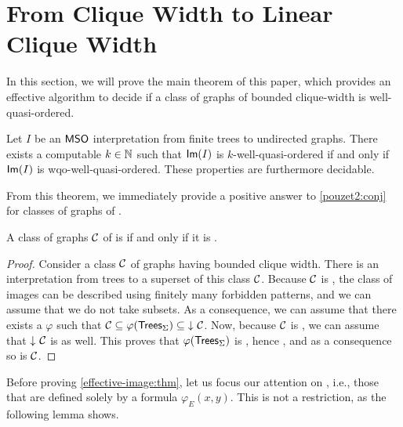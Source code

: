 \section{From Clique Width to Linear Clique Width}
\label{sec:bad-patterns}




In this section, we will prove the main theorem of this paper, which provides
an effective algorithm to decide if a class of graphs of bounded clique-width
is well-quasi-ordered. 

\begin{theorem}[restate=effective-image:thm,label={effective-image:thm}]
    \label{effective-image:thm}
    Let $I$ be an $\mathsf{MSO}$ interpretation
    from finite trees to undirected graphs.
    There exists a computable $k \in \mathbb{N}$
    such that $\mathsf{Im}(I)$
    is $k$-well-quasi-ordered
    if and only if 
    $\mathsf{Im}(I)$ is wqo-well-quasi-ordered.
    These properties are furthermore decidable.
\end{theorem}

From this theorem, we immediately provide a positive answer to
\cref{pouzet2:conj} for classes of graphs of .

\begin{corollary}
    \label{effective-image:cor}
    A class of graphs $\Cls$ of  
    is 
    if and only if it is .
\end{corollary}
\begin{proof}
    Consider a class $\Cls$ of graphs having bounded clique width.
    There is an interpretation from trees to a superset of this class $\Cls$.
    Because $\Cls$ is , the class of images
    can be described using finitely many forbidden patterns,
    and we can assume that we do not take subsets.
    As a consequence, we can assume that there exists a $\varphi$
    such that $\Cls \subseteq \varphi(\Trees{\Sigma}) \subseteq \dwset{\Cls}$.
    Now, because $\Cls$ is , we can assume that
    $\dwset{\Cls}$ is  as well.
    This proves that $\varphi(\mathsf{Trees}_{\Sigma})$ is ,
    hence ,
    and as a consequence so is $\Cls$.
\end{proof}

Before proving \cref{effective-image:thm}, let us focus our attention on
, i.e., those that are defined solely by a
formula $\varphi_E(x,y)$.
This is not a restriction, as the following lemma
shows.

